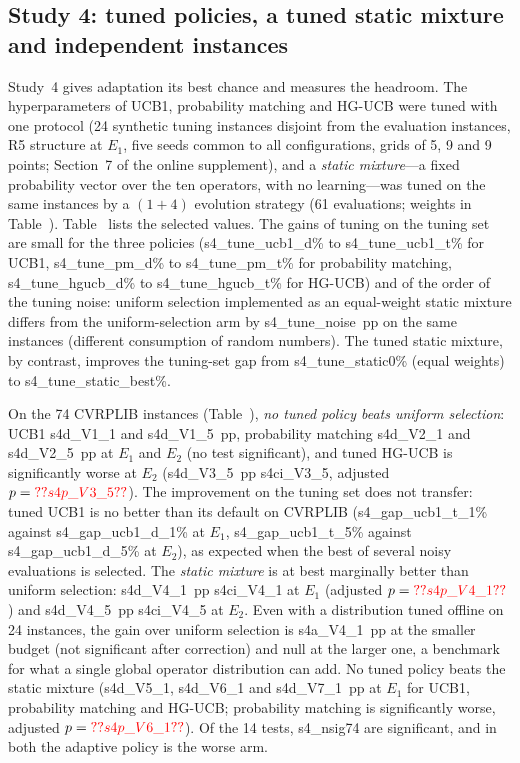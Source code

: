 \subsection{Study 4: tuned policies, a tuned static mixture and independent instances}\label{sec:s4}
Study~4 gives adaptation its best chance and measures the headroom. The hyperparameters of UCB1, probability matching and HG-UCB were tuned with one protocol (24 synthetic tuning instances disjoint from the evaluation instances, R5 structure at $E_1$, five seeds common to all configurations, grids of 5, 9 and 9 points; Section~7 of the online supplement), and a \emph{static mixture}---a fixed probability vector over the ten operators, with no learning---was tuned on the same instances by a $(1{+}4)$ evolution strategy (61 evaluations; weights in Table~). Table~ lists the selected values. The gains of tuning on the tuning set are small for the three policies (\num{s4_tune_ucb1_d}\% to \num{s4_tune_ucb1_t}\% for UCB1, \num{s4_tune_pm_d}\% to \num{s4_tune_pm_t}\% for probability matching, \num{s4_tune_hgucb_d}\% to \num{s4_tune_hgucb_t}\% for HG-UCB) and of the order of the tuning noise: uniform selection implemented as an equal-weight static mixture differs from the uniform-selection arm by \num{s4_tune_noise}~pp on the same instances (different consumption of random numbers). The tuned static mixture, by contrast, improves the tuning-set gap from \num{s4_tune_static0}\% (equal weights) to \num{s4_tune_static_best}\%.



On the 74 CVRPLIB instances (Table~), \emph{no tuned policy beats uniform selection}: UCB1 \num{s4d_V1_1} and \num{s4d_V1_5}~pp, probability matching \num{s4d_V2_1} and \num{s4d_V2_5}~pp at $E_1$ and $E_2$ (no test significant), and tuned HG-UCB is significantly worse at $E_2$ (\num{s4d_V3_5}~pp \num{s4ci_V3_5}, adjusted $p=\num{s4p_V3_5}$). The improvement on the tuning set does not transfer: tuned UCB1 is no better than its default on CVRPLIB (\num{s4_gap_ucb1_t_1}\% against \num{s4_gap_ucb1_d_1}\% at $E_1$, \num{s4_gap_ucb1_t_5}\% against \num{s4_gap_ucb1_d_5}\% at $E_2$), as expected when the best of several noisy evaluations is selected. The \emph{static mixture} is at best marginally better than uniform selection: \num{s4d_V4_1}~pp \num{s4ci_V4_1} at $E_1$ (adjusted $p=\num{s4p_V4_1}$) and \num{s4d_V4_5}~pp \num{s4ci_V4_5} at $E_2$. Even with a distribution tuned offline on 24 instances, the gain over uniform selection is \num{s4a_V4_1}~pp at the smaller budget (not significant after correction) and null at the larger one, a benchmark for what a single global operator distribution can add. No tuned policy beats the static mixture (\num{s4d_V5_1}, \num{s4d_V6_1} and \num{s4d_V7_1}~pp at $E_1$ for UCB1, probability matching and HG-UCB; probability matching is significantly worse, adjusted $p=\num{s4p_V6_1}$). Of the 14 tests, \num{s4_nsig74} are significant, and in both the adaptive policy is the worse arm.

